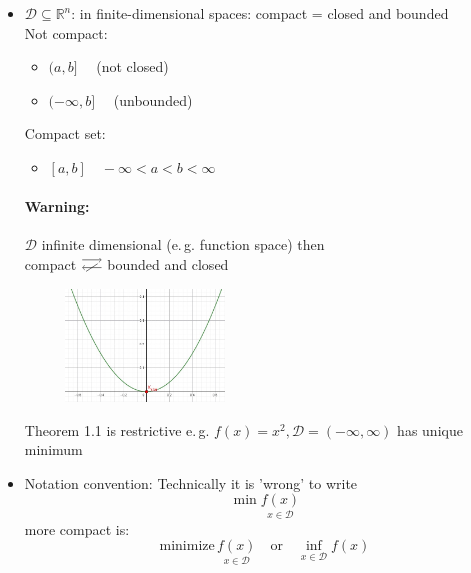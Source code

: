 \documentclass[12pt,a4paper,oneside]{scrartcl}
\begin{document}
	\begin{itemize}
		\item $\mathcal{D} \subseteq \mathbb{R}^n$: in finite-dimensional spaces: compact = closed and bounded\\
		Not compact:
		\begin{itemize}
			\item $(a,b]\quad$ (not closed)
			\item $(-\infty,b]\quad$ (unbounded)
		\end{itemize}
		Compact set:
		\begin{itemize}
			\item $[a,b]\quad-\infty<a<b<\infty$
		\end{itemize}
	
	\paragraph{Warning:}
	$\mathcal{D}$ infinite dimensional (e.\,g. function space) then\\
	\hspace*{10mm}compact $\begin{tikzpicture}[baseline={(0,-0.25ex)}]
		\draw[->] (0,0.2) -- (0.5,0.2);
		\draw[<-] (0,0.0) -- (0.5,0.0);
		\draw[line width=0.4pt] (0.1,-0.1) -- (0.4, 0.1);
	\end{tikzpicture}$ bounded and closed
	
	\begin{figure}[H]
		\centering
		\includegraphics[width=0.4\textwidth]{images/1.0-2.jpg}
	\end{figure}	
	Theorem 1.1 is restrictive e.\,g. $f(x) = x^2, \mathcal{D} = (-\infty,\infty)$ has unique minimum
	\item Notation convention: Technically it is 'wrong' to write
	\[
		\min\underset{x\in\mathcal{D}}{f(x)}
	\]
	more compact is:
	\[
		\text{minimize}\,\underset{x\in\mathcal{D}}{f(x)} \quad \text{or} \quad \underset{x\in\mathcal{D}}{\inf}f(x)
	\]
	\end{itemize}
	
\end{document}
